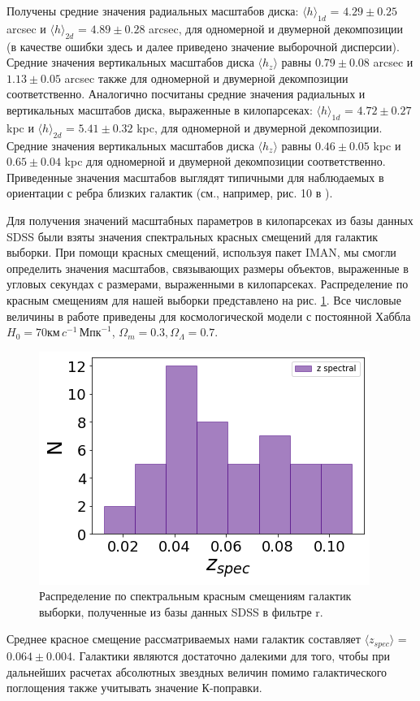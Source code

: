 Получены средние значения радиальных масштабов диска: $\langle h \rangle_{1d}$ = $4.29 \pm 0.25$ arcsec и $\langle h \rangle_{2d}$ = $4.89 \pm 0.28$ arcsec, для одномерной и двумерной декомпозиции (в качестве ошибки здесь и далее приведено значение выборочной дисперсии).
Средние значения вертикальных масштабов диска $\langle h_z \rangle$ равны $0.79 \pm 0.08$ arcsec и $1.13 \pm 0.05$ arcsec также для одномерной и двумерной декомпозиции соответственно. Аналогично посчитаны
средние значения радиальных и вертикальных масштабов диска, выраженные в килопарсеках: $\langle h \rangle_{1d}$ = $4.72 \pm 0.27$ kpc и $\langle h \rangle_{2d}$ = $5.41 \pm 0.32$ kpc, для одномерной и двумерной декомпозиции. 
Средние значения вертикальных масштабов диска $\langle h_z \rangle$ равны $0.46 \pm 0.05$ kpc и $0.65 \pm 0.04$ kpc  для одномерной и двумерной декомпозиции соответственно. 
Приведенные значения масштабов выглядят типичными для наблюдаемых в ориентации с ребра близких галактик (см., например,
рис. 10 в \cite{2014ApJ...787...24B}).

Для получения значений масштабных параметров в килопарсеках из базы данных SDSS были взяты значения спектральных красных смещений для галактик выборки. При помощи красных смещений, используя пакет IMAN, мы смогли определить значения масштабов, связывающих размеры объектов, выраженные в угловых секундах с размерами, выраженными в килопарсеках. Распределение по красным смещениям для нашей выборки представлено на рис. \ref{fig:z_spec}. Все числовые величины в работе приведены для космологической
модели с постоянной Хаббла $H_0=70км\,c^{-1}\,\textrm{Мпк}^{-1}$, $\Omega_m=0.3, \Omega_{\Lambda}=0.7$.
\begin{figure}[th]
    \centering
    \includegraphics[width=.8\textwidth]{plot_results/z_spec.png}
    \caption{Распределение по спектральным красным смещениям галактик выборки, полученные из базы данных SDSS в фильтре r. }\label{fig:z_spec}
\end{figure}
Среднее красное смещение рассматриваемых нами галактик составляет $\langle z_{spec} \rangle$ = $0.064 \pm 0.004$. Галактики являются достаточно далекими для того, чтобы при дальнейших расчетах абсолютных звездных величин помимо галактического поглощения также учитывать значение К-поправки.

